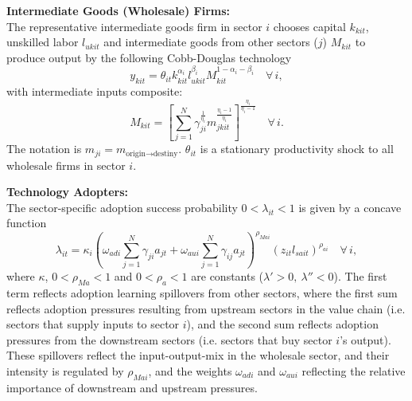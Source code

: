 \documentclass[compress,xcolor=dvipsnames]{beamer}
\begin{document}
\begin{frame}
\textbf{Intermediate Goods (Wholesale) Firms:} \\
The representative intermediate goods firm in sector $i$ chooses capital $k_{kit}$, unskilled labor $l_{ukit}$ and intermediate goods from other sectors ($j$) $M_{kit}$ to produce output by the following Cobb-Douglas technology
\begin{equation}
y_{kit}=\theta_{it}k_{kit}^{\alpha_i} l_{ukit}^{\beta_i} M_{kit}^{1-\alpha_i-\beta_i}\quad\forall\,i,
\end{equation}
with intermediate inputs composite:
\begin{equation}
M_{kit}=\left[\sum_{j=1}^N \gamma_{ji}^{\frac{1}{\eta_i}}m_{jkit}^{\frac{\eta_i-1}{\eta_i}}\right]^{\frac{\eta_i}{\eta_i-1}}\quad\forall\,i.
\end{equation}
The notation is $m_{ji}=m_{\text{origin}\to\text{destiny}}$.
$\theta_{it}$ is  a stationary productivity shock to all wholesale firms in sector $i$.
\end{frame}

\begin{frame}
\textbf{Technology Adopters:} \\
The sector-specific adoption success probability $0<\lambda_{it}<1$ is given by a concave function
\begin{equation} \label{eq:AD2}
\lambda_{it} = \kappa_i \left( \omega_{adi} \sum_{j=1}^N \gamma_{ji} a_{jt} + \omega_{aui} \sum_{j=1}^N \gamma_{ij} a_{jt} \right)^{\rho_{Mai}} (z_{it}l_{sait})^{\rho_{ai}}\quad\forall\,i,
\end{equation}
where $\kappa$, $0<\rho_{Ma}<1$ and $0<\rho_a<1$ are constants ($\lambda'>0,\  \lambda''<0$). The first term reflects adoption learning spillovers from other sectors, where the first sum reflects adoption pressures resulting from upstream sectors in the value chain (i.e. sectors that supply inputs to sector $i$), and the second sum reflects adoption pressures from the downstream sectors (i.e. sectors that buy sector $i$'s output). These spillovers reflect the input-output-mix in the wholesale sector, and their intensity is regulated by $\rho_{Mai}$, and the weights $\omega_{adi}$ and $\omega_{aui}$ reflecting the relative importance of downstream and upstream pressures. 
\end{frame}
\end{document}
